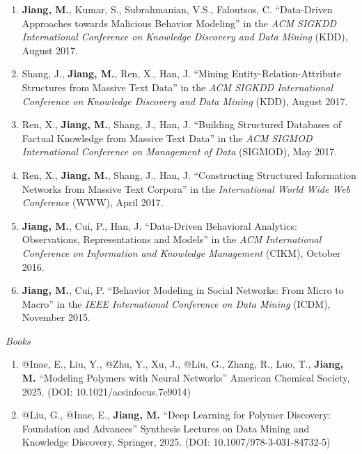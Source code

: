\documentclass[10pt]{article}
\newenvironment{myindentpar}[1]%
{\begin{list}{}%
         {\setlength{\leftmargin}{#1}}%
         \item[]%
}
{\end{list}}
\newcounter{list}
\begin{document}
\begin{myindentpar}{0.00cm}
\begin{enumerate}[leftmargin=.5cm]
\item[T6] \textbf{Jiang, M.}, Kumar, S., Subrahmanian, V.S., Faloutsos, C. ``Data-Driven Approaches towards Malicious Behavior Modeling'' in the \textit{ACM SIGKDD International Conference on Knowledge Discovery and Data Mining} (KDD), August 2017.

\item[T5] Shang, J., \textbf{Jiang, M.}, Ren, X., Han, J. ``Mining Entity-Relation-Attribute Structures from Massive Text Data'' in the \textit{ACM SIGKDD International Conference on Knowledge Discovery and Data Mining} (KDD), August 2017.

\item[T4] Ren, X., \textbf{Jiang, M.}, Shang, J., Han, J. ``Building Structured Databases of Factual Knowledge from Massive Text Data'' in the \textit{ACM SIGMOD International Conference on Management of Data} (SIGMOD), May 2017.
		
\item[T3] Ren, X., \textbf{Jiang, M.}, Shang, J., Han, J. ``Constructing Structured Information Networks from Massive Text Corpora'' in the \textit{International World Wide Web Conference}  (WWW), April 2017.

\item[T2] \textbf{Jiang, M.}, Cui, P., Han, J. ``Data-Driven Behavioral Analytics: Observations, Representations and Models'' in the \textit{ACM International Conference on Information and Knowledge Management} (CIKM), October 2016.
		
\item[T1] \textbf{Jiang, M.}, Cui, P. ``Behavior Modeling in Social Networks: From Micro to Macro'' in the \textit{IEEE International Conference on Data Mining} (ICDM), November 2015.

\end{enumerate}

\hspace{-0.25cm}\textit{Books}

\begin{enumerate}[leftmargin=.5cm]

\item[B6] @Inae, E., Liu, Y., @Zhu, Y., Xu, J., @Liu, G., Zhang, R., Luo, T., \textbf{Jiang, M.} ``Modeling Polymers with Neural Networks'' American Chemical Society, 2025. (DOI: 10.1021/acsinfocus.7e9014)

\item[B5] @Liu, G., @Inae, E., \textbf{Jiang, M.} ``Deep Learning for Polymer Discovery: Foundation and Advances'' Synthesis Lectures on Data Mining and Knowledge Discovery, Springer, 2025. (DOI: 10.1007/978-3-031-84732-5)
		

\end{enumerate}
\end{myindentpar}
\end{document}
